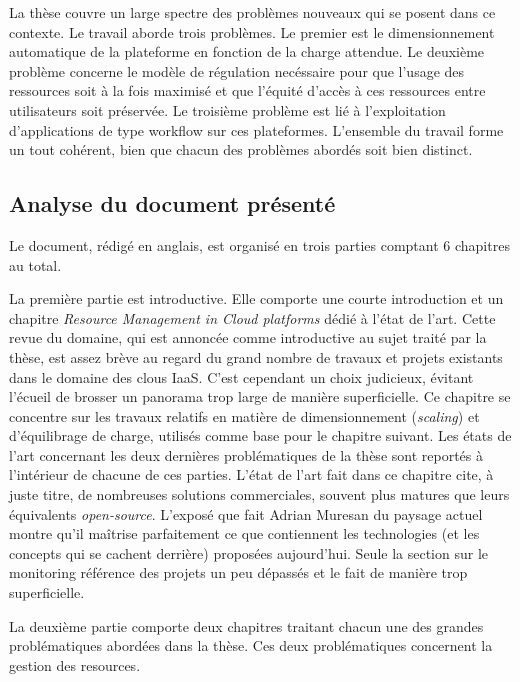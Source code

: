 \documentclass[a4paper,12pt]{article}
\begin{document}
La thèse couvre  un large spectre des  problèmes nouveaux qui se  posent dans ce
contexte.  Le travail aborde trois  problèmes. Le premier est le dimensionnement
automatique de  la plateforme en  fonction de  la charge attendue.   Le deuxième
problème  concerne le  modèle  de  régulation necéssaire  pour  que l'usage  des
ressources soit  à la  fois maximisé  et que l'équité  d'accès à  ces ressources
entre utilisateurs soit préservée. Le troisième problème est lié à l'exploitation 
d'applications de type workflow sur ces plateformes.
%
L'ensemble du  travail forme  un tout  cohérent, bien  que chacun  des problèmes
abordés soit bien distinct. 

\vspace{-3mm}
\subsection*{Analyse du document présenté}
Le  document,  rédigé en  anglais,  est  organisé  en  trois parties  comptant  6
chapitres au total. 

La première partie est introductive. Elle comporte une courte introduction et un
chapitre  \textit{Resource Management  in  Cloud platforms}  dédié  à l'état  de
l'art.  Cette  revue du domaine,  qui est  annoncée comme introductive  au sujet
traité par  la thèse, est assez  brève au regard  du grand nombre de  travaux et
projets  existants dans  le domaine  des clous  IaaS. C'est  cependant un  choix
judicieux,  évitant  l'écueil de  brosser  un  panorama  trop large  de  manière
superficielle.  Ce chapitre se concentre sur  les travaux relatifs en matière de
dimensionnement (\textit{scaling})  et d'équilibrage  de charge,  utilisés comme
base pour le chapitre suivant.  Les états de l'art concernant les deux dernières
problématiques  de la  thèse  sont  reportés à  l'intérieur  de  chacune de  ces
parties.   L'état  de l'art  fait  dans  ce chapitre  cite,  à  juste titre,  de
nombreuses solutions  commerciales, souvent  plus matures que  leurs équivalents
\emph{open-source}.  L'exposé que  fait Adrian Muresan du  paysage actuel montre
qu'il maîtrise parfaitement ce que contiennent les technologies (et les concepts
qui  se  cachent  derrière)  proposées  aujourd'hui. Seule  la  section  sur  le
monitoring référence  des projets  un peu  dépassés et le  fait de  manière trop
superficielle.


La  deuxième partie  comporte deux  chapitres  traitant chacun  une des  grandes
problématiques abordées  dans la thèse.   Ces deux problématiques  concernent la
gestion des  resources.  
\end{document}
